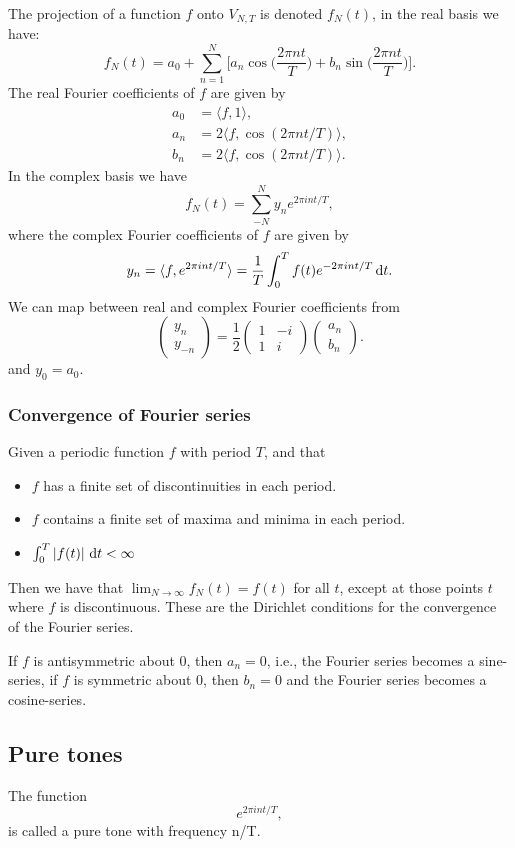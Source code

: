 \documentclass[a4paper, 11pt, notitlepage, english]{article}
\renewcommand{\d}{{\rm d}}
\newcommand{\inner}[2]{\langle #1 , #2 \rangle}
\begin{document}
The projection of a function $f$ onto $V_{N,T}$ is denoted $f_N(t)$, in the real basis we have:
$$f_N(t) = a_0 + \sum_{n=1}^N \bigg[ a_n \cos\bigg(\frac{2\pi n t}{T}\bigg) + b_n \sin\bigg(\frac{2\pi n t}{T}\bigg)\bigg].$$
The real Fourier coefficients of $f$ are given by
\begin{align*}
a_0 &= \inner{f}{1}, \\
a_n &= 2\inner{f}{\cos(2\pi n t/T)}, \\
b_n &= 2\inner{f}{\cos(2\pi n t/T)}.
\end{align*}
In the complex basis we have
$$f_N(t) = \sum_{-N}^N y_n e^{2\pi i n t /T},$$
where the complex Fourier coefficients of $f$ are given by
$$y_n = \langle f, e^{2\pi i n t/T} \rangle= \frac{1}{T}\int_0^T f(t) e^{-2\pi i n t/T}\, \d t. $$
We can map between real and complex Fourier coefficients from
$$
\begin{pmatrix}
y_n \\ y_{-n}   
\end{pmatrix}
 = \frac{1}{2}\begin{pmatrix}
   1 & -i \\ 1 & i  
 \end{pmatrix}
 \begin{pmatrix}
     a_n \\ b_n
 \end{pmatrix}.$$
and $y_0 = a_0$.

\subsubsection*{Convergence of Fourier series}
Given a periodic function $f$ with period $T$, and that 
\begin{itemize}
 \item $f$ has a finite set of discontinuities in each period.
 \item $f$ contains a finite set of maxima and minima in each period.
 \item $\int_0^T |f(t)| \ \d t < \infty$
\end{itemize}
Then we have that $\lim_{N\to\infty} f_N(t) = f(t)$ for all $t$, except at those points $t$ where $f$ is discontinuous. These are the Dirichlet conditions for the convergence of the Fourier series.

If $f$ is antisymmetric about 0, then $a_n = 0$, i.e., the Fourier series becomes a sine-series, if $f$ is symmetric about 0, then $b_n = 0$ and the Fourier series becomes a cosine-series.

\subsection*{Pure tones}
The function
$$e^{2\pi i n t/T},$$
is called a pure tone with frequency n/T.
\end{document}
